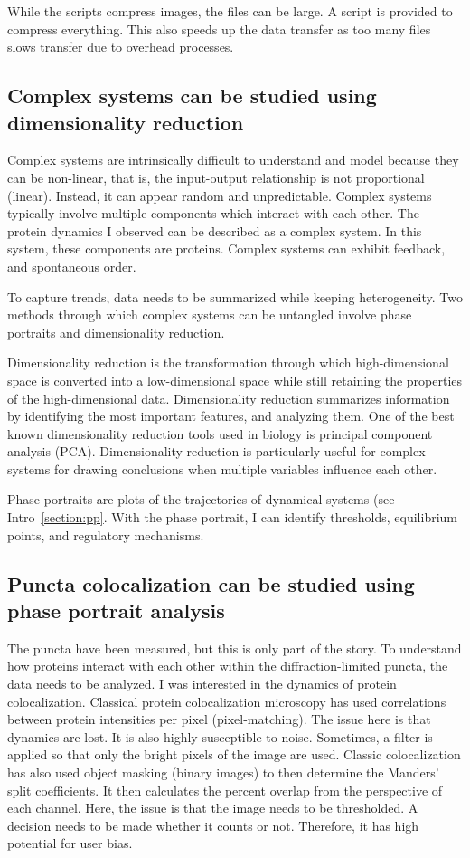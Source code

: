 While the scripts compress images, the files can be large. A script is provided to compress everything. This also speeds up the data transfer as too many files slows transfer due to overhead processes.

\subsection{Complex systems can be studied using dimensionality reduction}
\label{section:complex}
Complex systems are intrinsically difficult to understand and model because they can be non-linear, that is, the input-output relationship is not proportional (linear). Instead, it can appear random and unpredictable. Complex systems typically involve multiple components which interact with each other. The protein dynamics I observed can be described as a complex system. In this system, these components are proteins. Complex systems can exhibit feedback, and spontaneous order.

To capture trends, data needs to be summarized while keeping heterogeneity. Two methods through which complex systems can be untangled involve phase portraits and dimensionality reduction.

Dimensionality reduction is the transformation through which high-dimensional space is converted into a low-dimensional space while still retaining the properties of the high-dimensional data. Dimensionality reduction summarizes information by identifying the most important features, and analyzing them. One of the best known dimensionality reduction tools used in biology is principal component analysis (PCA). Dimensionality reduction is particularly useful for complex systems for drawing conclusions when multiple variables influence each other.

Phase portraits are plots of the trajectories of dynamical systems (see Intro~\ref{section:pp}. With the phase portrait, I can identify thresholds, equilibrium points, and regulatory mechanisms.

\subsection{Puncta colocalization can be studied using phase portrait analysis}
\label{section:pp_method}
The puncta have been measured, but this is only part of the story. To understand how proteins interact with each other within the diffraction-limited puncta, the data needs to be analyzed. I was interested in the dynamics of protein colocalization. Classical protein colocalization microscopy has used correlations between protein intensities per pixel (pixel-matching). The issue here is that dynamics are lost. It is also highly susceptible to noise. Sometimes, a filter is applied so that only the bright pixels of the image are used. Classic colocalization has also used object masking (binary images) to then determine the Manders’ split coefficients. It then calculates the percent overlap from the perspective of each channel. Here, the issue is that the image needs to be thresholded. A decision needs to be made whether it counts or not. Therefore, it has high potential for user bias.


